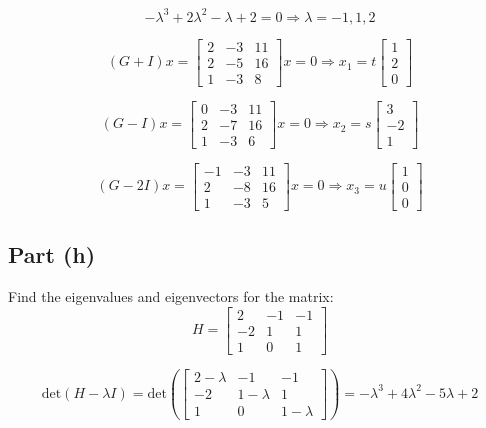 \documentclass[12pt]{article}
\begin{document}
\[
  -\lambda^3 + 2\lambda^2 - \lambda + 2 = 0 \Rightarrow \lambda = -1, 1, 2
\]

\[
  (G + I)x = \begin{bmatrix} 2 & -3 & 11 \\ 2 & -5 & 16 \\ 1 & -3 & 8 \end{bmatrix}x = 0 \Rightarrow x_1 = t\begin{bmatrix} 1 \\ 2 \\ 0 \end{bmatrix}
\]

\[
  (G - I)x = \begin{bmatrix} 0 & -3 & 11 \\ 2 & -7 & 16 \\ 1 & -3 & 6 \end{bmatrix}x = 0 \Rightarrow x_2 = s\begin{bmatrix} 3 \\ -2 \\ 1 \end{bmatrix}
\]

\[
  (G - 2I)x = \begin{bmatrix} -1 & -3 & 11 \\ 2 & -8 & 16 \\ 1 & -3 & 5 \end{bmatrix}x = 0 \Rightarrow x_3 = u\begin{bmatrix} 1 \\ 0 \\ 0 \end{bmatrix}
\]

\pagebreak

\subsection*{Part (h)}
Find the eigenvalues and eigenvectors for the matrix:
\[
  H = \begin{bmatrix} 2 & -1 & -1 \\ -2 & 1 & 1 \\ 1 & 0 & 1 \end{bmatrix}
\]

\[
  \text{det}(H - \lambda I) = \text{det}\left(\begin{bmatrix} 2-\lambda & -1 & -1 \\ -2 & 1-\lambda & 1 \\ 1 & 0 & 1-\lambda \end{bmatrix}\right) = -\lambda^3 + 4\lambda^2 - 5\lambda + 2
\]
\end{document}
